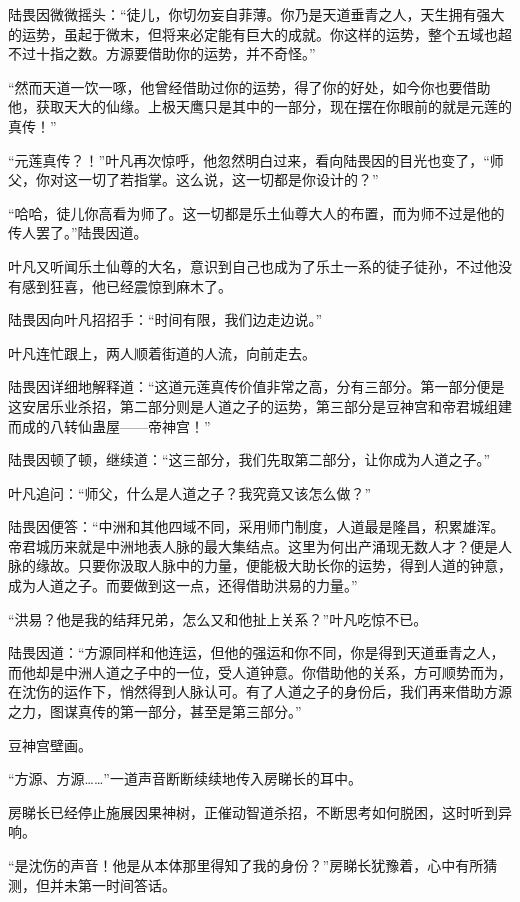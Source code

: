 \begin{this_body}
陆畏因微微摇头：“徒儿，你切勿妄自菲薄。你乃是天道垂青之人，天生拥有强大的运势，虽起于微末，但将来必定能有巨大的成就。你这样的运势，整个五域也超不过十指之数。方源要借助你的运势，并不奇怪。”

“然而天道一饮一啄，他曾经借助过你的运势，得了你的好处，如今你也要借助他，获取天大的仙缘。上极天鹰只是其中的一部分，现在摆在你眼前的就是元莲的真传！”

“元莲真传？！”叶凡再次惊呼，他忽然明白过来，看向陆畏因的目光也变了，“师父，你对这一切了若指掌。这么说，这一切都是你设计的？”

“哈哈，徒儿你高看为师了。这一切都是乐土仙尊大人的布置，而为师不过是他的传人罢了。”陆畏因道。

叶凡又听闻乐土仙尊的大名，意识到自己也成为了乐土一系的徒子徒孙，不过他没有感到狂喜，他已经震惊到麻木了。

陆畏因向叶凡招招手：“时间有限，我们边走边说。”

叶凡连忙跟上，两人顺着街道的人流，向前走去。

陆畏因详细地解释道：“这道元莲真传价值非常之高，分有三部分。第一部分便是这安居乐业杀招，第二部分则是人道之子的运势，第三部分是豆神宫和帝君城组建而成的八转仙蛊屋——帝神宫！”

陆畏因顿了顿，继续道：“这三部分，我们先取第二部分，让你成为人道之子。”

叶凡追问：“师父，什么是人道之子？我究竟又该怎么做？”

陆畏因便答：“中洲和其他四域不同，采用师门制度，人道最是隆昌，积累雄浑。帝君城历来就是中洲地表人脉的最大集结点。这里为何出产涌现无数人才？便是人脉的缘故。只要你汲取人脉中的力量，便能极大助长你的运势，得到人道的钟意，成为人道之子。而要做到这一点，还得借助洪易的力量。”

“洪易？他是我的结拜兄弟，怎么又和他扯上关系？”叶凡吃惊不已。

陆畏因道：“方源同样和他连运，但他的强运和你不同，你是得到天道垂青之人，而他却是中洲人道之子中的一位，受人道钟意。你借助他的关系，方可顺势而为，在沈伤的运作下，悄然得到人脉认可。有了人道之子的身份后，我们再来借助方源之力，图谋真传的第一部分，甚至是第三部分。”

豆神宫壁画。

“方源、方源……”一道声音断断续续地传入房睇长的耳中。

房睇长已经停止施展因果神树，正催动智道杀招，不断思考如何脱困，这时听到异响。

“是沈伤的声音！他是从本体那里得知了我的身份？”房睇长犹豫着，心中有所猜测，但并未第一时间答话。


\end{this_body}
